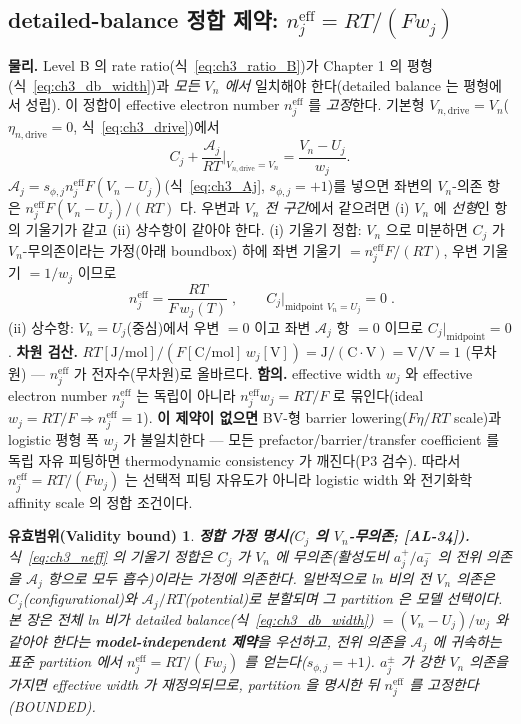 \documentclass[11pt,a4paper]{article}
\newtheorem*{boundbox}{유효범위(Validity bound)}
\newcommand{\eff}{\mathrm{eff}}
\newcommand{\drive}{\mathrm{drive}}
\newcommand{\AL}[1]{\textsf{[AL-#1]}}
\begin{document}
\subsection{detailed-balance 정합 제약: $n_j^{\eff}=RT/(Fw_j)$}\label{sec:ch3_neff}
\textbf{물리.} Level B 의 rate ratio(식~\eqref{eq:ch3_ratio_B})가 Chapter 1 의 평형(식~\eqref{eq:ch3_db_width})과
\emph{모든 $V_n$ 에서} 일치해야 한다(detailed balance 는 평형에서 성립). 이 정합이 effective electron number
$n_j^{\eff}$ 를 \emph{고정}한다. 기본형 $V_{n,\drive}=V_n$($\eta_{n,\drive}=0$, 식~\eqref{eq:ch3_drive})에서
\begin{equation}
C_j+\frac{\mathcal A_j}{RT}\Big|_{V_{n,\drive}=V_n}=\frac{V_n-U_j}{w_j}.
\label{eq:ch3_dbmatch}
\end{equation}
$\mathcal A_j=s_{\phi,j}n_j^{\eff}F(V_n-U_j)$(식~\eqref{eq:ch3_Aj}, $s_{\phi,j}=+1$)를 넣으면 좌변의 $V_n$-의존
항은 $n_j^{\eff}F(V_n-U_j)/(RT)$ 다. 우변과 \emph{$V_n$ 전 구간}에서 같으려면 (i) $V_n$ 에 \emph{선형}인 항의
기울기가 같고 (ii) 상수항이 같아야 한다. (i) 기울기 정합: $V_n$ 으로 미분하면 $C_j$ 가 $V_n$-무의존이라는
가정(아래 boundbox) 하에 좌변 기울기 $=n_j^{\eff}F/(RT)$, 우변 기울기 $=1/w_j$ 이므로
\begin{equation}
\boxed{\;n_j^{\eff}=\frac{RT}{F\,w_j(T)}\;,\qquad C_j\big|_{\text{midpoint }V_n=U_j}=0\;.}
\label{eq:ch3_neff}
\end{equation}
(ii) 상수항: $V_n=U_j$(중심)에서 우변 $=0$ 이고 좌변 $\mathcal A_j$ 항 $=0$ 이므로 $C_j|_{\text{midpoint}}=0$.
\textbf{차원 검산.} $RT[\mathrm{J/mol}]/(F[\mathrm{C/mol}]\,w_j[\mathrm V])=\mathrm{J/(C\cdot V)}=\mathrm{V/V}=1$
(무차원) — $n_j^{\eff}$ 가 전자수(무차원)로 올바르다. \textbf{함의.} effective width $w_j$ 와 effective electron
number $n_j^{\eff}$ 는 독립이 아니라 $n_j^{\eff}w_j=RT/F$ 로 묶인다(ideal $w_j=RT/F\Rightarrow n_j^{\eff}=1$).
\textbf{이 제약이 없으면} BV-형 barrier lowering($F\eta/RT$ scale)과 logistic 평형 폭 $w_j$ 가 불일치한다 —
모든 prefactor/barrier/transfer coefficient 를 독립 자유 피팅하면 thermodynamic consistency 가 깨진다(P3 검수).
따라서 $n_j^{\eff}=RT/(Fw_j)$ 는 선택적 피팅 자유도가 아니라 logistic width 와 전기화학 affinity scale 의 정합 조건이다.
\begin{boundbox}
\textbf{정합 가정 명시($C_j$ 의 $V_n$-무의존; \AL{34}).} 식~\eqref{eq:ch3_neff} 의 기울기 정합은 $C_j$ 가 $V_n$
에 무의존(활성도비 $a_j^+/a_j^-$ 의 전위 의존을 $\mathcal A_j$ 항으로 모두 흡수)이라는 가정에 의존한다. 일반적으로
ln 비의 전 $V_n$ 의존은 $C_j$(configurational)와 $\mathcal A_j/RT$(potential)로 분할되며 그 partition 은 모델
선택이다. 본 장은 \emph{전체 ln 비가 detailed balance(식~\eqref{eq:ch3_db_width}) $=(V_n-U_j)/w_j$ 와 같아야
한다}는 \textbf{model-independent 제약}을 우선하고, 전위 의존을 $\mathcal A_j$ 에 귀속하는 표준 partition 에서
$n_j^{\eff}=RT/(Fw_j)$ 를 얻는다($s_{\phi,j}=+1$). $a_j^\pm$ 가 강한 $V_n$ 의존을 가지면 effective width 가
재정의되므로, partition 을 명시한 뒤 $n_j^{\eff}$ 를 고정한다(BOUNDED).
\end{boundbox}
\end{document}
